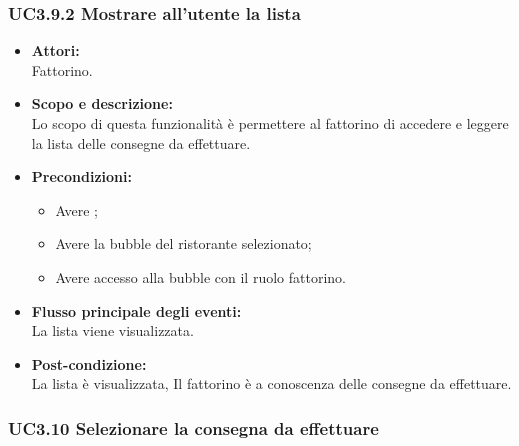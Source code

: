 \subsubsection{UC3.9.2 Mostrare all’utente la lista} \label{UC3.9.2}

\begin{itemize}
	\item \textbf{Attori:}
	\\Fattorino.
	\item \textbf{Scopo e descrizione:} 
	\\Lo scopo di questa funzionalità è permettere al fattorino di accedere e leggere la lista delle consegne da effettuare.
	\item \textbf{Precondizioni:}
	\begin{itemize}
		\item Avere ;
		\item Avere la bubble del ristorante selezionato;
		\item Avere accesso alla bubble con il ruolo fattorino.
	\end{itemize}
	\item \textbf{Flusso principale degli eventi:}
	\\La lista viene visualizzata.
	\item \textbf{Post-condizione:}
	\\La lista è visualizzata, Il fattorino è a conoscenza delle consegne da effettuare.
\end{itemize}

\subsubsection{UC3.10 Selezionare la consegna da effettuare} \label{UC3.10}

